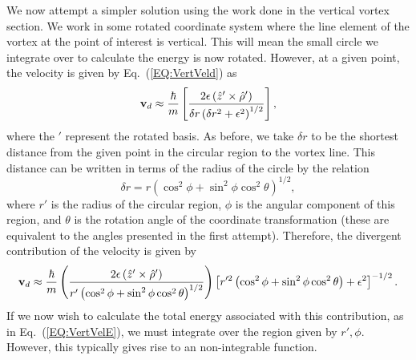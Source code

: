 \documentclass[onecolumn,nofootinbib,superscriptaddress]{revtex4}
\begin{document}
We now attempt a simpler solution using the work done in the vertical vortex section.  We work in some rotated coordinate system where the line element of the vortex at the point of interest is vertical.  This will mean the small circle we integrate over to calculate the energy is now rotated.  However, at a given point, the velocity is given by Eq.~(\ref{EQ:VertVeld}) as
\begin{equation}
{\bf v}_d \approx \frac{\hbar}{m}\left[\frac{2\epsilon\left(\hat{z}'\times\hat{\rho}'\right)}{\delta r \left(\delta r^2 + \epsilon^2\right)^{1/2}}\right],
\end{equation}
where the $'$ represent the rotated basis.  As before, we take $\delta r$ to be the shortest distance from the given point in the circular region to the vortex line.  This distance can be written in terms of the radius of the circle by the relation
\begin{equation}
\delta r = r\left(\cos^2\phi + \sin^2\phi\cos^2\theta\right)^{1/2},
\end{equation}
where $r'$ is the radius of the circular region, $\phi$ is the angular component of this region, and $\theta$ is the rotation angle of the coordinate transformation (these are equivalent to the angles presented in the first attempt).  Therefore, the divergent contribution of the velocity is given by
\begin{equation}
{\bf v}_d \approx \frac{\hbar}{m}\left(\frac{2\epsilon\left(\hat{z}'\times\hat{\rho}'\right)}{r'\left(\cos^2\phi + \sin^2\phi\cos^2\theta\right)^{1/2}}\right)\left[r'^2\left(\cos^2\phi + \sin^2\phi\cos^2\theta\right) + \epsilon^2\right]^{-1/2}.
\end{equation}
If we now wish to calculate the total energy associated with this contribution, as in Eq.~(\ref{EQ:VertVelE}), we must integrate over the region given by $r', \phi$.  However, this typically gives rise to an non-integrable function.
\end{document}
